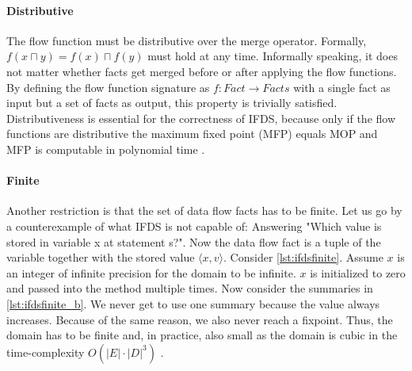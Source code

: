 \documentclass[../draft.tex]{subfiles}
\begin{document}
    \paragraph{Distributive} The flow function must be distributive over the merge operator. Formally, $f(x \sqcap y) = f(x) \sqcap f(y)$ must hold at any time. Informally speaking, it does not matter whether facts get merged before or after applying the flow functions. By defining the flow function signature as $f: \mathit{Fact} \rightarrow \mathit{Facts}$ with a single fact as input but a set of facts as output, this property is trivially satisfied. Distributiveness is essential for the correctness of IFDS, because only if the flow functions are distributive the maximum fixed point (MFP) equals MOP and MFP is computable in polynomial time \cite{Khedker2009,Reps1995}.

    \paragraph{Finite} Another restriction is that the set of data flow facts has to be finite. Let us go by a counterexample of what IFDS is not capable of: Answering "Which value is stored in variable x at statement s?".
    Now the data flow fact is a tuple of the variable together with the stored value $\langle x, v \rangle$. Consider \autoref{lst:ifdsfinite}. Assume $x$ is an integer of infinite precision for the domain to be infinite.
    $x$ is initialized to zero and passed into the method  multiple times. Now consider the summaries in \autoref{lst:ifdsfinite_b}. We never get to use one summary because the value always increases. Because of the same reason, we also never reach a fixpoint. Thus, the domain has to be finite and, in practice, also small as the domain is cubic in the time-complexity $O(|E| \cdot |D|^3)$  \cite{Reps1995}.
    
\end{document}
